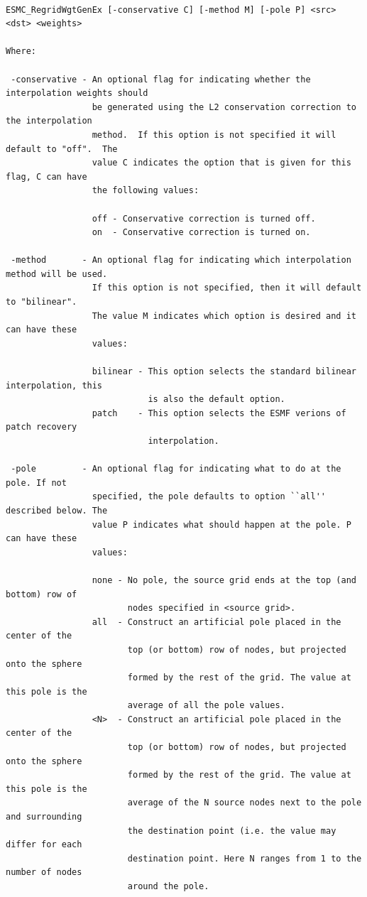\begin{verbatim}

ESMC_RegridWgtGenEx [-conservative C] [-method M] [-pole P] <src> <dst> <weights>

Where:

 -conservative - An optional flag for indicating whether the interpolation weights should
                 be generated using the L2 conservation correction to the interpolation
                 method.  If this option is not specified it will default to "off".  The 
                 value C indicates the option that is given for this flag, C can have 
                 the following values:

                 off - Conservative correction is turned off. 
                 on  - Conservative correction is turned on.  

 -method       - An optional flag for indicating which interpolation method will be used.
                 If this option is not specified, then it will default to "bilinear".
                 The value M indicates which option is desired and it can have these 
                 values:

                 bilinear - This option selects the standard bilinear interpolation, this
                            is also the default option.
                 patch    - This option selects the ESMF verions of patch recovery 
                            interpolation.

 -pole         - An optional flag for indicating what to do at the pole. If not 
                 specified, the pole defaults to option ``all'' described below. The 
                 value P indicates what should happen at the pole. P can have these 
                 values:

                 none - No pole, the source grid ends at the top (and bottom) row of 
                        nodes specified in <source grid>.
                 all  - Construct an artificial pole placed in the center of the 
                        top (or bottom) row of nodes, but projected onto the sphere 
                        formed by the rest of the grid. The value at this pole is the 
                        average of all the pole values.
                 <N>  - Construct an artificial pole placed in the center of the 
                        top (or bottom) row of nodes, but projected onto the sphere 
                        formed by the rest of the grid. The value at this pole is the 
                        average of the N source nodes next to the pole and surrounding
                        the destination point (i.e. the value may differ for each
                        destination point. Here N ranges from 1 to the number of nodes 
                        around the pole. 
                  

\end{verbatim}
